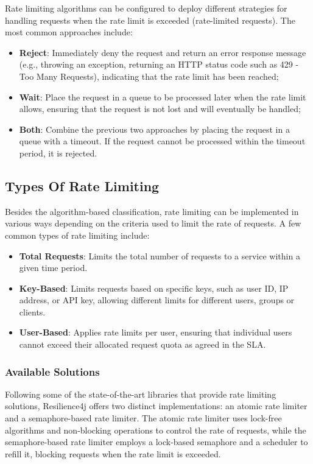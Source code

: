 Rate limiting algorithms can be configured
to deploy different strategies for handling requests when the rate limit is exceeded
(rate-limited requests).
The most common approaches include:

\begin{itemize}
    \item \textbf{Reject}: Immediately deny the request and return an error response message (e.g., throwing an exception,
    returning an HTTP status code such as 429 - Too Many Requests), indicating that the rate limit has been reached;
    \item \textbf{Wait}: Place the request in a queue to be processed later when the rate limit allows, ensuring that the request is not lost and will eventually be handled;
    \item \textbf{Both}: Combine the previous two approaches by placing the request in a queue with a timeout.
    If the request cannot be processed within the timeout period, it is rejected.
\end{itemize}

\subsection{Types Of Rate Limiting}\label{subsec:rate-limiter-types}

Besides the algorithm-based classification, rate limiting can be implemented in various ways depending on the criteria used to limit the rate of requests.
A few common types of rate limiting include:
\begin{itemize}
    \item \textbf{Total Requests}: Limits the total number of requests to a service within a given time period.
    \item \textbf{Key-Based}: Limits requests based on specific keys, such as user ID, IP address, or API key,
    allowing different limits for different users, groups or clients.
    \item \textbf{User-Based}: Applies rate limits per user,
    ensuring that individual users cannot exceed their allocated request quota as agreed in the SLA.
\end{itemize}

\subsubsection{Available Solutions}\label{subsubsec:rate-limiter-solutions}

Following some of the state-of-the-art libraries that provide rate limiting solutions,
Resilience4j offers two distinct implementations: an atomic rate limiter and a semaphore-based rate limiter.
The atomic rate limiter uses lock-free algorithms and non-blocking operations to control the rate of requests,
while the semaphore-based rate limiter employs a lock-based semaphore and a scheduler to refill it,
blocking requests when the rate limit is exceeded.

